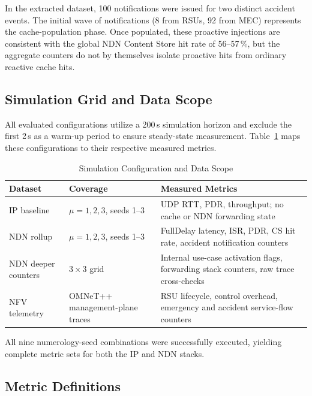 \documentclass[journal]{IEEEtran}
\begin{document}
In the extracted dataset, 100 notifications were issued for two distinct accident events. The initial wave of notifications (8 from RSUs, 92 from MEC) represents the cache-population phase. Once populated, these proactive injections are consistent with the global NDN Content Store hit rate of 56--57\,\%, but the aggregate counters do not by themselves isolate proactive hits from ordinary reactive cache hits.

\subsection{Simulation Grid and Data Scope}

All evaluated configurations utilize a 200\,s simulation horizon and exclude the first 2\,s as a warm-up period to ensure steady-state measurement. Table~\ref{tab:prov} maps these configurations to their respective measured metrics.

\begin{table}[!t]\centering
\caption{Simulation Configuration and Data Scope}
\label{tab:prov}
\footnotesize
\begin{tabular}{@{}p{}p{}p{}@{}}
\toprule
Dataset & Coverage & Measured Metrics\\
\midrule
IP baseline & $\mu=1,2,3$, seeds 1--3 & UDP RTT, PDR, throughput; no cache or NDN forwarding state\\
NDN rollup & $\mu=1,2,3$, seeds 1--3 & FullDelay latency, ISR, PDR, CS hit rate, accident notification counters\\
NDN deeper counters & $3\times3$ grid & Internal use-case activation flags, forwarding stack counters, raw trace cross-checks\\
NFV telemetry & OMNeT++ management-plane traces & RSU lifecycle, control overhead, emergency and accident service-flow counters\\
\bottomrule
\end{tabular}
\end{table}

All nine numerology-seed combinations were successfully executed, yielding complete metric sets for both the IP and NDN stacks.

\subsection{Metric Definitions}
\end{document}
